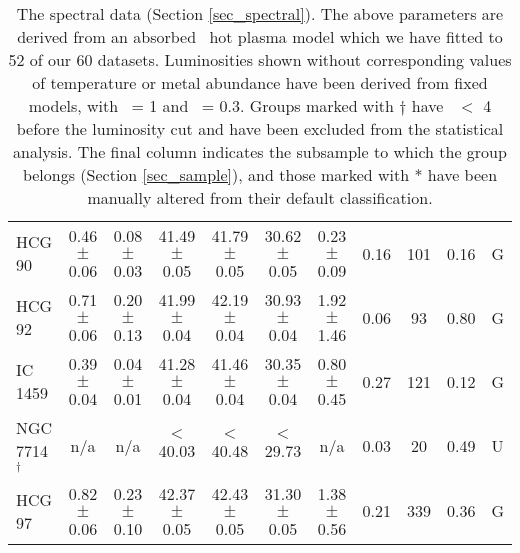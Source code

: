 \begin{table*}
\begin{center}
\begin{tabular}{@{}lcccccccccl@{}}
HCG 90               &  0.46 $\pm$ 0.06  &  0.08 $\pm$ 0.03  &  41.49 $\pm$ 0.05  &  41.79  $\pm$ 0.05  &  30.62 $\pm$ 0.05  &  0.23 $\pm$ 0.09  &  0.16         &  101                &  0.16                &  G      \\
HCG 92               &  0.71 $\pm$ 0.06  &  0.20 $\pm$ 0.13  &  41.99 $\pm$ 0.04  &  42.19  $\pm$ 0.04  &  30.93 $\pm$ 0.04  &  1.92 $\pm$ 1.46  &  0.06         &  93                 &  0.80                &  G      \\
IC  1459             &  0.39 $\pm$ 0.04  &  0.04 $\pm$ 0.01  &  41.28 $\pm$ 0.04  &  41.46  $\pm$ 0.04  &  30.35 $\pm$ 0.04  &  0.80 $\pm$ 0.45  &  0.27         &  121                &  0.12                &  G      \\
NGC 7714$^{\dagger}$ &  n/a              &  n/a              &  $<$40.03          &  $<$40.48           &  $<$29.73          &  n/a              &  0.03         &  20                 &  0.49                &  U      \\
HCG 97               &  0.82 $\pm$ 0.06  &  0.23 $\pm$ 0.10  &  42.37 $\pm$ 0.05  &  42.43  $\pm$ 0.05  &  31.30 $\pm$ 0.05  &  1.38 $\pm$ 0.56  &  0.21         &  339                &  0.36                &  G      \\


\hline          
\end{tabular}   
\end{center}    


\caption        
{\label{tab_spectral}   
The spectral data (Section \ref{sec_spectral}).  The above parameters are derived
from an absorbed \MEKAL\ hot plasma model which we have fitted to 52 of our 60
datasets.  Luminosities shown without corresponding values of temperature or
metal abundance have been derived from fixed models, with \TX\ = 1 and \Z\ = 0.3.
Groups marked with $\dagger$ have \Ngal\ $<$ 4 before the luminosity cut and have
been excluded from the statistical analysis.  The final column indicates the
subsample to which the group belongs (Section \ref{sec_sample}), and those marked
with * have been manually altered from their default classification.}


\end{table*}

